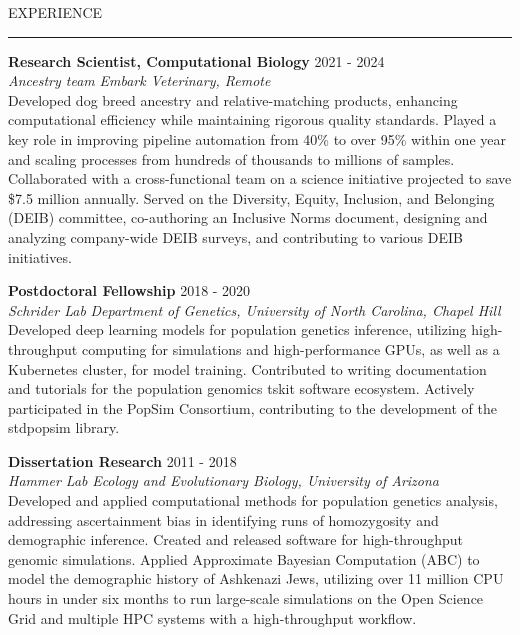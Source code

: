 \documentclass{resume} %
\renewenvironment{rSection}[1]{
\sectionskip
\textcolor{RoyalPurple}{\MakeUppercase{#1}}
\sectionlineskip
\hrule
\begin{list}{}{
\setlength{\leftmargin}{1.5em}
}
\item[]
}{
\end{list}
}
\begin{document}
\begin{rSection}{Experience}


{\bf Research Scientist, Computational Biology} \hfill  2021 - 2024\\ 
{\em Ancestry team} \hfill {\em Embark Veterinary, Remote}\\
Developed dog breed ancestry and relative-matching products, enhancing computational efficiency while maintaining rigorous quality standards. Played a key role in improving pipeline automation from 40\% to over 95\% within one year and scaling processes from hundreds of thousands to millions of samples. Collaborated with a cross-functional team on a science initiative projected to save \$7.5 million annually.
Served on the Diversity, Equity, Inclusion, and Belonging (DEIB) committee, co-authoring an Inclusive Norms document, designing and analyzing company-wide DEIB surveys, and contributing to various DEIB initiatives.


{\bf Postdoctoral Fellowship} \hfill  2018 - 2020\\ 
{\em Schrider Lab} \hfill {\em Department of Genetics, University of North Carolina, Chapel Hill}\\
Developed deep learning models for population genetics inference, utilizing high-throughput computing for simulations and high-performance GPUs, as well as a Kubernetes cluster, for model training. Contributed to writing documentation and tutorials for the population genomics tskit software ecosystem. Actively participated in the PopSim Consortium, contributing to the development of the stdpopsim library.

{\bf Dissertation Research} \hfill  2011 - 2018\\ 
{\em Hammer Lab} \hfill {\em Ecology and Evolutionary Biology, University of Arizona}\\
Developed and applied computational methods for population genetics analysis, addressing ascertainment bias in identifying runs of homozygosity and demographic inference. Created and released software for high-throughput genomic simulations. Applied Approximate Bayesian Computation (ABC) to model the demographic history of Ashkenazi Jews, utilizing over 11 million CPU hours in under six months to run large-scale simulations on the Open Science Grid and multiple HPC systems with a high-throughput workflow. 




\end{rSection}
\end{document}
